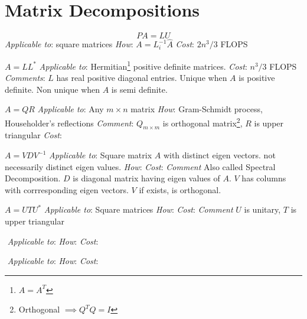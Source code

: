 \section{Matrix Decompositions}

\def\moo#1{\emph{#1}}
\begin{slide}[LU Decomposition]
   $$PA =LU$$
   \moo{Applicable to}: square matrices
   \moo{How}: $A = L_i^{-1}\hat{A}$
   \moo{Cost}: $2n^3/3$ FLOPS
\end{slide}
\begin{slide}
   $A = LL^*$
   \moo{Applicable to}: Hermitian\footnote{$A=A^T$} positive definite matrices. 
   \moo{Cost}: $n^3/3$ FLOPS
   \moo{Comments}: $L$ has real positive diagonal entries. Unique when $A$ is positive definite. Non unique when $A$ is semi definite.
\end{slide}
\begin{slide}[ QR decomposition]
   $ A = Q R$
   \moo{Applicable to}: Any $m\times n$ matrix
   \moo{How}: Gram-Schmidt process, Householder's reflections
   \moo{Comment}: $Q_{m\times m}$ is orthogonal matrix\footnote{Orthogonal $\implies Q^TQ=I$}, $R$ is upper triangular
   \moo{Cost}:
\end{slide}
\begin{slide}
   $A = VDV^{-1} $
   \moo{Applicable to}: Square matrix $A$ with distinct eigen vectors. not necessarily distinct eigen values.
   \moo{How}: 
   \moo{Cost}:
   \moo{Comment} Also called Spectral Decomposition. $D$ is diagonal matrix having eigen values of $A$. $V$ has columns with corrresponding eigen vectors. $V$ if exists, is orthogonal.
\end{slide}
\begin{slide}
   $ A = UTU^{*}$
   \moo{Applicable to}: Square matrices
   \moo{How}: 
   \moo{Cost}:
   \moo{Comment} $U$ is unitary, $T$ is upper triangular
\end{slide}
\begin{slide}[ SVD]
   $ $
   \moo{Applicable to}:
   \moo{How}: 
   \moo{Cost}:
\end{slide}
\begin{slide}
   $ $
   \moo{Applicable to}:
   \moo{How}: 
   \moo{Cost}:
\end{slide}

